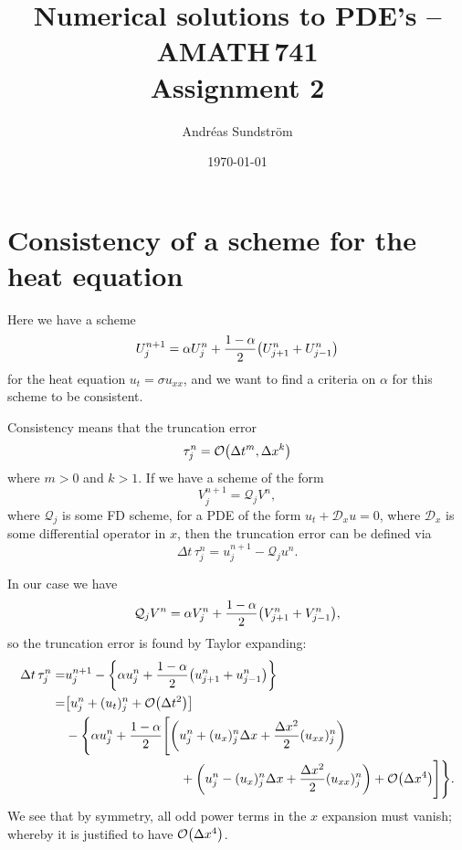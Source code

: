 \documentclass[11pt,letter, swedish, english
]{article}
\newcommand{\Dx}{\ensuremath{\Delta{x}}}
\newcommand{\Dt}{\ensuremath{\Delta{t}}}
\begin{document}

\title{Numerical solutions to PDE's -- AMATH\,741 \\
Assignment 2}
\author{Andréas Sundström}
\date{\today}

\maketitle



\section{Consistency of a scheme for the heat equation}
Here we have a scheme
\begin{equation}
U_j^{n+1}=\alpha U_j^n+\frac{1-\alpha}{2}\qty(U_{j+1}^n+U_{j-1}^n)
\end{equation}
for the heat equation $u_t=\sigma u_{xx}$, and we want to find a
criteria on $\alpha$ for this scheme to be consistent.

Consistency means that the truncation error
\begin{equation}
\tau_j^n=\order{\Dt^m, \Dx^k}
\end{equation}
where $m>0$ and $k>1$. 
If we have a scheme of the form
\begin{equation}
V^{n+1}_j=\mathcal{Q}_jV^n,
\end{equation}
where $\mathcal{Q}_j$ is some FD scheme, for a PDE of the form
$u_t+\mathcal{D}_xu=0$, where $\mathcal{D}_x$ is some differential
operator in $x$, then the truncation error can be defined via
\begin{equation}
\Dt\,\tau_j^{n}=u_j^{n+1}-\mathcal{Q}_ju^n.
\end{equation}

In our case we have
\begin{equation}
\mathcal{Q}_jV^n=\alpha V_j^n+\frac{1-\alpha}{2}\qty(V_{j+1}^n+V_{j-1}^n),
\end{equation}
so the truncation error is found by Taylor expanding:
\begin{equation}
\begin{aligned}
\Dt\,\tau_j^n=&u_j^{n+1}
-\qty{\alpha u_j^n+\frac{1-\alpha}{2}\qty(u_{j+1}^n+u_{j-1}^n)}\\
=& \qty[u_j^n+(u_t)_j^n+\order{\Dt^2}]\\
&-\Bigg\{\alpha u_j^n+\frac{1-\alpha}{2}
\Bigg[\qty(u_j^n+(u_x)_j^n\Dx+\frac{\Dx^2}{2}(u_{xx})_j^n)\\
&\hspace{90pt}+\qty(u_j^n-(u_x)_j^n\Dx+\frac{\Dx^2}{2}(u_{xx})_j^n)
+\order{\Dx^4}\Bigg]\Bigg\}.
\end{aligned}
\end{equation}
We see that by symmetry, all odd power terms in the $x$ expansion must
vanish; whereby  it is justified to have $\order{\Dx^4}$. 
\end{document}

